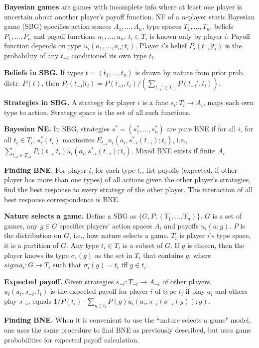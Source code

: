 \documentclass[a4paper,11pt,landscape]{article}
\begin{document}
\begin{multicols*}{3}
\textbf{Bayesian games} are games with incomplete info where at least one player is uncertain about another player's payoff function. NF of a $n$-player static Bayesian game (SBG) specifies action spaces $A_1,\ldots,A_n$, type spaces $T_1,\ldots,T_n$, beliefs $P_1,\ldots,P_n$ and payoff functions $u_1,\ldots,u_n$. $t_i\in T_i$ is known only by player $i$. Payoff function depends on type $u_i(a_1,\ldots,a_n;t_i)$. Player $i$'s belief $P_i(t_{-i}|t_i)$ is the probability of any $t_{-i}$ conditioned its own type $t_i$.

\textbf{Beliefs in SBG.} If types $t=(t_1,\ldots,t_n)$ is drawn by nature from prior prob. distr. $P(t)$, then $P_i(t_{-i}|t_i)=P(t_{-i},t_i)/(\sum_{t_{-i}'\in T_{-i}}P(t_{-i}',t_i))$.

\textbf{Strategies in SBG.} A strategy for player $i$ is a func $s_i:T_i\to A_i$, maps each own type to action. Strategy space is the set of all such functions.

\textbf{Bayesian NE.} In SBG, strategies $s^*=(s_1^*,\ldots,s_n^*)$ are pure BNE if for all $i$, for all $t_i\in T_i$, $s_i^*(t_i)$ maximizes $E_{t_{-i}}u_i(a_i,s_{-i}^*(t_{-i});t_i)$, i.e., $\sum_{t_{-i}\in T_{-i}} P_i(t_{-i}|t_i)u_i(a_i,s_{-i}^*(t_{-i});t_i)$. Mixed BNE exists if finite $A_i$. 

\textbf{Finding BNE.} For player $i$, for each type $t_i$, list payoffs (expected, if other player has more than one types) of all actions given the other player's strategies, find the best response to every strategy of the other player. The interaction of all best response correspondence is BNE.

\textbf{Nature selects a game.} Define a SBG as $\{G,P,(T_1,\ldots,T_n)\}$. $G$ is a set of games, any $g\in G$ specifies players' action spaces $A_i$ and payoffs $u_i(a;g)$. $P$ is the distribution on $G$, i.e., how nature selects a game. $T_i$ is player $i$'s type space, it is a partition of $G$. Any type $t_i\in T_i$ is a subset of $G$. If $g$ is chosen, then the player knows its type $\sigma_i(g)$ as the set in $T_i$ that contains $g$, where $sigma_i:G\to T_i$ such that $\sigma_i(g)=t_i$ iff $g\in t_i$.

\textbf{Expected payoff.} Given strategies $s_{-i}:T_{-i}\to A_{-i}$ of other players, $u_i(a_i,s_{-i};t_i)$ is the expected payoff for player $i$ of type $t_i$ if play $a_i$ and others play $s_{-i}$, equals $1/P(t_i)\cdot\sum_{g\in t_{i}} P(g)u_i(a_i,s_{-i}(\sigma_{-i}(g));g)$.

\textbf{Finding BNE.} When it is convenient to use the ``nature selects a game" model, one uses the same procedure to find BNE as previously described, but uses game probabilities for expected payoff calculation.


\end{multicols*}
\end{document}
